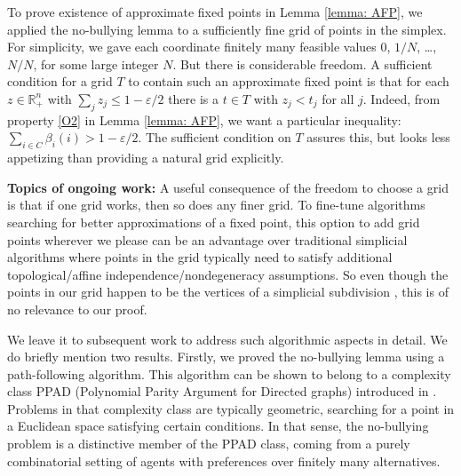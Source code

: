 \documentclass[english, 11pt]{article}
\theoremstyle{plain} %
\theoremstyle{definition}
\begin{document}
To prove existence of approximate fixed points in Lemma \ref{lemma: AFP}, we applied the no-bullying lemma to a sufficiently fine grid of points in the simplex. For simplicity, we gave each coordinate finitely many feasible values $0$, $1/N$, \ldots, $N/N$, for some large integer $N$. But there is considerable freedom. A sufficient condition for a grid $T$ to contain such an approximate fixed point is that for each $z \in \mathbb{R}^n_+$ with $\sum_j z_j \leq 1 - \varepsilon/2$ there is a $t \in T$ with $z_j < t_j$ for all $j$. Indeed, from property \ref{O2} in Lemma \ref{lemma: AFP}, we want a particular inequality: $\sum_{i \in C} \beta_i(i) > 1 - \varepsilon/2$. The sufficient condition on $T$ assures this, but looks less appetizing than providing a natural grid explicitly.

\textbf{Topics of ongoing work:} A useful consequence of the freedom to choose a grid is that if one grid works, then so does any finer grid. To fine-tune algorithms searching for better approximations of a fixed point, this option to add grid points wherever we please can be an advantage over traditional simplicial algorithms where points in the grid typically need to satisfy additional topological/affine independence/nondegeneracy assumptions. So even though the points in our grid happen to be the vertices of a simplicial subdivision \citep[p.~1240]{Kuhn1968}, this is of no relevance to our proof.

We leave it to subsequent work to address such algorithmic aspects in detail. We do briefly mention two results. Firstly, we proved the no-bullying lemma using a path-following algorithm. This algorithm can be shown to belong to a complexity class PPAD (Polynomial Parity Argument for Directed graphs) introduced in \citet{Papadimitriou1994}. Problems in that complexity class are typically geometric, searching for a point in a Euclidean space satisfying certain conditions. In that sense, the no-bullying problem is a distinctive member of the PPAD class, coming from a purely combinatorial setting of agents with preferences over finitely many alternatives.
\end{document}
